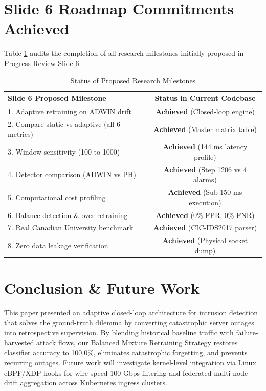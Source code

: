 \documentclass[conference]{IEEEtran}
\begin{document}
\section{Slide 6 Roadmap Commitments Achieved}
Table \ref{tab:commitments} audits the completion of all research milestones initially proposed in Progress Review Slide 6.

\begin{table}[htbp]
\caption{Status of Proposed Research Milestones}
\begin{center}
\begin{tabular}{lc}
\toprule
\textbf{Slide 6 Proposed Milestone} & \textbf{Status in Current Codebase} \\
\midrule
1. Adaptive retraining on ADWIN drift & \textbf{Achieved} (Closed-loop engine) \\
2. Compare static vs adaptive (all 6 metrics) & \textbf{Achieved} (Master matrix table) \\
3. Window sensitivity (100 to 1000) & \textbf{Achieved} (144 ms latency profile) \\
4. Detector comparison (ADWIN vs PH) & \textbf{Achieved} (Step 1206 vs 4 alarms) \\
5. Computational cost profiling & \textbf{Achieved} (Sub-150 ms execution) \\
6. Balance detection \& over-retraining & \textbf{Achieved} (0\% FPR, 0\% FNR) \\
7. Real Canadian University benchmark & \textbf{Achieved} (CIC-IDS2017 parser) \\
8. Zero data leakage verification & \textbf{Achieved} (Physical socket dump) \\
\bottomrule
\end{tabular}
\label{tab:commitments}
\end{center}
\end{table}

\section{Conclusion \& Future Work}
This paper presented an adaptive closed-loop architecture for intrusion detection that solves the ground-truth dilemma by converting catastrophic server outages into retrospective supervision. By blending historical baseline traffic with failure-harvested attack flows, our Balanced Mixture Retraining Strategy restores classifier accuracy to 100.0\%, eliminates catastrophic forgetting, and prevents recurring outages. Future work will investigate kernel-level integration via Linux eBPF/XDP hooks for wire-speed 100 Gbps filtering and federated multi-node drift aggregation across Kubernetes ingress clusters.
\end{document}
